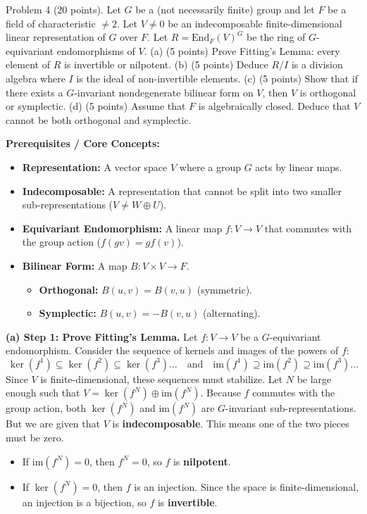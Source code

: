 \begin{exercise}
\label{algebra:2016:9}
Problem 4 (20 points). Let $G$ be a (not necessarily finite) group and let $F$ be a field of characteristic $\neq 2$. Let $V \neq 0$ be an indecomposable finite-dimensional linear representation of $G$ over $F$. Let $R = \mathrm{End}_F(V)^G$ be the ring of $G$-equivariant endomorphisms of $V$.
(a) (5 points) Prove Fitting's Lemma: every element of $R$ is invertible or nilpotent.
(b) (5 points) Deduce $R/I$ is a division algebra where $I$ is the ideal of non-invertible elements.
(c) (5 points) Show that if there exists a $G$-invariant nondegenerate bilinear form on $V$, then $V$ is orthogonal or symplectic.
(d) (5 points) Assume that $F$ is algebraically closed. Deduce that $V$ cannot be both orthogonal and symplectic.
\end{exercise}
\begin{solution}
\textbf{Prerequisites / Core Concepts:}
\begin{itemize}
    \item \textbf{Representation:} A vector space $V$ where a group $G$ acts by linear maps.
    \item \textbf{Indecomposable:} A representation that cannot be split into two smaller sub-representations ($V \neq W \oplus U$).
    \item \textbf{Equivariant Endomorphism:} A linear map $f: V \to V$ that commutes with the group action ($f(gv) = g f(v)$).
    \item \textbf{Bilinear Form:} A map $B: V \times V \to F$.
    \begin{itemize}
        \item \textbf{Orthogonal:} $B(u, v) = B(v, u)$ (symmetric).
        \item \textbf{Symplectic:} $B(u, v) = -B(v, u)$ (alternating).
    \end{itemize}
\end{itemize}

\textbf{(a) Step 1: Prove Fitting's Lemma.}
Let $f: V \to V$ be a $G$-equivariant endomorphism. Consider the sequence of kernels and images of the powers of $f$:
\[ \ker(f^1) \subseteq \ker(f^2) \subseteq \ker(f^3) \dots \quad \text{and} \quad \text{im}(f^1) \supseteq \text{im}(f^2) \supseteq \text{im}(f^3) \dots \]
Since $V$ is finite-dimensional, these sequences must stabilize. Let $N$ be large enough such that $V = \ker(f^N) \oplus \text{im}(f^N)$.
Because $f$ commutes with the group action, both $\ker(f^N)$ and $\text{im}(f^N)$ are $G$-invariant sub-representations.
But we are given that $V$ is \textbf{indecomposable}. This means one of the two pieces must be zero.
\begin{itemize}
    \item If $\text{im}(f^N) = 0$, then $f^N = 0$, so $f$ is \textbf{nilpotent}.
    \item If $\ker(f^N) = 0$, then $f$ is an injection. Since the space is finite-dimensional, an injection is a bijection, so $f$ is \textbf{invertible}.
\end{itemize}


\end{solution}
